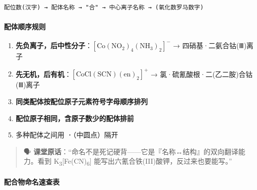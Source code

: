 \documentclass[a4paper,11pt]{ctexart}
\providecommand{\tightlist}{\setlength{\itemsep}{0pt}\setlength{\parskip}{0pt}}
\begin{document}
\begin{verbatim}
配位数(汉字) → 配体名称 → "合" → 中心离子名称 → (氧化数罗马数字)
\end{verbatim}

\paragraph{配体顺序规则}\label{ux914dux4f53ux987aux5e8fux89c4ux5219}

\begin{enumerate}
\def\labelenumi{\arabic{enumi}.}
\tightlist
\item
  \textbf{先负离子，后中性分子}：\([\mathrm{Co(NO_2)_4(NH_3)_2}]^-\) → 四硝基·二氨合钴(Ⅲ)离子
\item
  \textbf{先无机，后有机}：\([\mathrm{CoCl(SCN)(en)_2}]^+\) → 氯·硫氰酸根·二(乙二胺)合钴(Ⅲ)离子
\item
  \textbf{同类配体按配位原子元素符号字母顺序排列}
\item
  \textbf{配位原子相同，含原子数少的配体排前}
\item
  多种配体之间用 \textbf{·}（中圆点）隔开
\end{enumerate}

\begin{quote}
🗣️ \textbf{课堂原话}：``命名不是死记硬背------它是『名称↔结构』的双向翻译能力。看到 K\textsubscript{3}{[}Fe(CN)\textsubscript{6}{]} 能写出六氰合铁(III)酸钾，反过来也要能写。''
\end{quote}

\paragraph{配合物命名速查表}\label{ux914dux5408ux7269ux547dux540dux901fux67e5ux8868}
\end{document}
